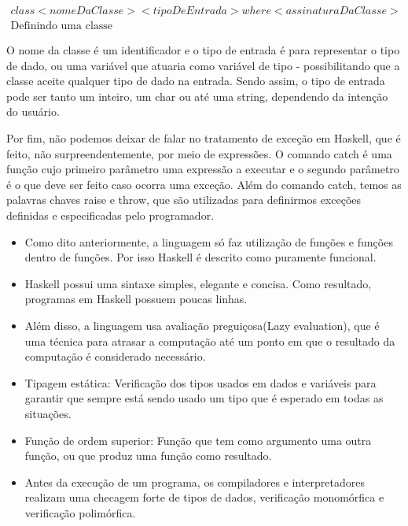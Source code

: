 \documentclass[
  12pt,				         %
  oneside,			       %
  a4paper,			       %
  english,		       	 %
  brazil,			      	 %
]{abntex2}
\begin{document}
    \begin{gather*}
      class<nomeDaClasse><tipoDeEntrada>where<assinaturaDaClasse> \\
      \text{Definindo uma classe}
    \end{gather*}

    O nome da classe é um identificador e o tipo de entrada é para representar o tipo de dado, ou uma variável que atuaria como variável de tipo - possibilitando que a classe aceite qualquer tipo
    de dado na entrada. Sendo assim, o tipo de entrada pode ser tanto um inteiro, um char ou até uma string, dependendo da intenção do usuário.

    Por fim, não podemos deixar de falar no tratamento de exceção em Haskell, que é feito, não surpreendentemente, por meio de expressões. O comando catch é uma função cujo primeiro parâmetro
    uma expressão a executar e o segundo parâmetro é o que deve ser feito caso ocorra uma exceção. Além do comando catch, temos as palavras chaves raise e throw, que são utilizadas para definirmos
    exceções definidas e especificadas pelo programador.

    \begin{itemize}
      \item Como dito anteriormente, a linguagem só faz utilização de funções e funções dentro de funções. Por isso
      Haskell é descrito como puramente funcional.
      \item Haskell possui uma sintaxe simples, elegante e concisa. Como resultado, programas em Haskell possuem 
      poucas linhas. 
      \item Além disso, a linguagem usa avaliação preguiçosa(Lazy evaluation), que é uma técnica para atrasar a computação 
      até um ponto em que o resultado da computação é considerado necessário.
      \item Tipagem estática: Verificação dos tipos usados em dados e variáveis para 
      garantir que sempre está sendo usado um tipo que é esperado em todas as situações. 
      \item Função de ordem superior: Função que tem como argumento uma outra função, ou que produz 
      uma função como resultado.
      \item Antes da execução de um programa, os compiladores e interpretadores realizam uma checagem forte de tipos
      de dados, verificação monomórfica e verificação polimórfica.
    \end{itemize}

    \newpage
\end{document}
